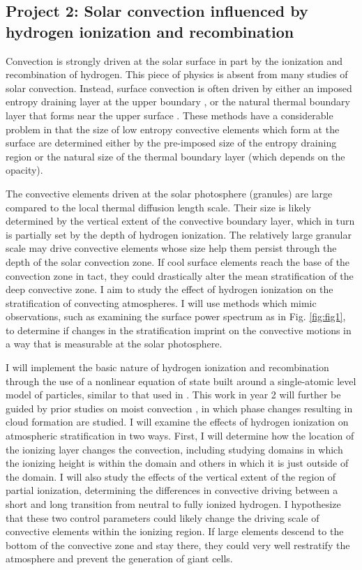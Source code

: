 \documentclass[aasms,12pt]{article}
\begin{document}
\vspace{-0.25cm}
\subsection{Project 2: Solar convection influenced by hydrogen ionization and recombination}
\vspace{-0.15cm}
Convection is strongly driven at the solar surface in part by the ionization and recombination of hydrogen.
This piece of physics is absent from many studies of solar convection. Instead, surface convection
is often driven by either an imposed entropy draining layer at the upper boundary \citep{kapyla&all2017}, 
or the natural thermal boundary layer that forms near the upper surface \citep{anders&brown2017}.
These methods have a considerable problem in that the size of low entropy
convective elements which form at the surface are determined either by the pre-imposed size of the
entropy draining region or the natural size of the thermal boundary layer (which depends on
the opacity).

The convective elements driven at the solar photosphere (granules) are large compared to the local
thermal diffusion length scale.  Their size is likely determined by the vertical extent of the convective
boundary layer, which in turn is partially set by the depth of hydrogen ionization.  The relatively large
granular scale may drive convective elements whose size help them persist through the depth of the solar
convection zone. If cool surface elements reach the base of the convection zone in tact, they could drastically
alter the mean stratification of the deep convective zone.  
I aim to study the effect of hydrogen ionization on the stratification of convecting atmospheres.
I will use methods which mimic observations, such as examining the surface power spectrum 
as in Fig. \ref{fig:fig1}, to determine if changes in the stratification imprint on the convective
motions in a way that is measurable at the solar photosphere.

I will implement the basic nature of hydrogen ionization and recombination through the use of
a nonlinear equation of state built around a single-atomic level model of particles,
similar to that used in \cite{rast&toomre1993}.
This work in year 2 will further be guided by prior studies on moist convection \citep{leconte&all2017},
in which phase changes resulting in cloud formation are studied. I will examine the effects of
hydrogen ionization on atmospheric stratification in two ways.  First, I will determine how the
location of the ionizing layer changes the convection, including studying domains in which the ionizing
height is within the domain and others in which it is just outside of the domain.
I will also study
the effects of the vertical extent of the region of partial ionization, determining the differences in convective
driving between a short and long transition from neutral to fully ionized hydrogen. I hypothesize that
these two control parameters could likely change the driving scale of convective elements within the
ionizing region.  If large elements descend to the bottom of the convective zone and stay there, they could very
well restratify the atmosphere and prevent the generation of giant cells.
\end{document}
